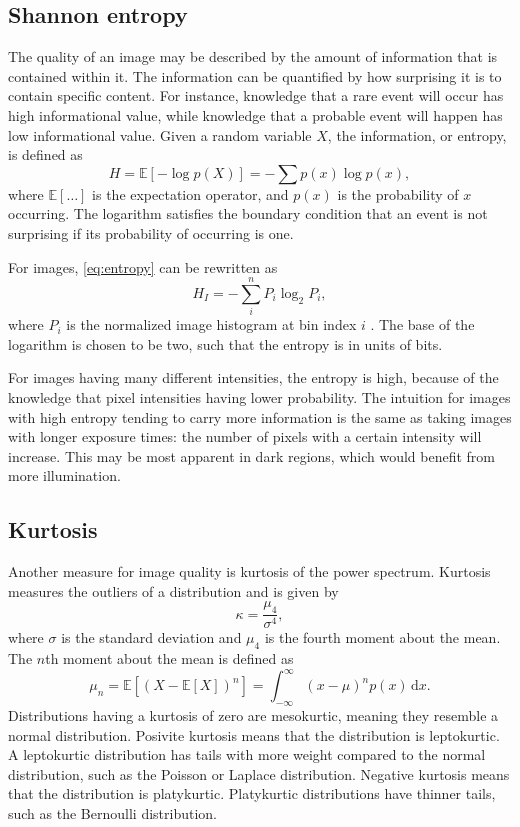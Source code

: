 \subsection{Shannon entropy}
The quality of an image may be described by the amount of information that is contained within it.
The information can be quantified by how surprising it is to contain specific content.
For instance, knowledge that a rare event will occur has high informational value, while knowledge that a probable event will happen has low informational value.
Given a random variable $X$, the information, or entropy, is defined as
\begin{equation}\label{eq:entropy}
    H = \mathbb{E}[-\log p(X)] = -\sum p(x) \log p(x),
\end{equation}
where $\mathbb{E}[\ldots]$ is the expectation operator, and $p(x)$ is the probability of $x$ occurring.
The logarithm satisfies the boundary condition that an event is not surprising if its probability of occurring is one.

For images, \cref{eq:entropy} can be rewritten as
\begin{equation}
    H_I = -\sum_{i}^n P_i \log_2 P_i,
\end{equation}
where $P_i$ is the normalized image histogram at bin index $i$ \cite{Koho2016}.
The base of the logarithm is chosen to be two, such that the entropy is in units of bits.

For images having many different intensities, the entropy is high, because of the knowledge that pixel intensities having lower probability.
The intuition for images with high entropy tending to carry more information is the same as taking images with longer exposure times:
the number of pixels with a certain intensity will increase.
This may be most apparent in dark regions, which would benefit from more illumination.

\subsection{Kurtosis}
Another measure for image quality is kurtosis of the power spectrum.
Kurtosis measures the outliers of a distribution and is given by
\begin{equation}
    \kappa = \frac{\mu_4}{\sigma^4},
\end{equation}
where $\sigma$ is the standard deviation and $\mu_4$ is the fourth moment about the mean.
The $n$th moment about the mean is defined as
\begin{equation}
    \mu_n = \mathbb{E}[(X-\mathbb{E}[X])^n] = \int_{-\infty}^\infty (x-\mu)^n p(x)\,\mathrm{d}x.
\end{equation}
Distributions having a kurtosis of zero are mesokurtic, meaning they resemble a normal distribution.
Posivite kurtosis means that the distribution is leptokurtic.
A leptokurtic distribution has tails with more weight compared to the normal distribution, such as the Poisson or Laplace distribution.
Negative kurtosis means that the distribution is platykurtic.
Platykurtic distributions have thinner tails, such as the Bernoulli distribution.


